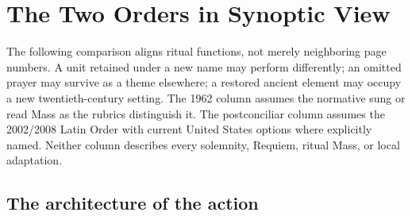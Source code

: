 \section{The Two Orders in Synoptic View}

The following comparison aligns ritual functions, not merely neighboring page numbers. A unit retained under a new name may perform differently; an omitted prayer may survive as a theme elsewhere; a restored ancient element may occupy a new twentieth-century setting. The 1962 column assumes the normative sung or read Mass as the rubrics distinguish it. The postconciliar column assumes the 2002/2008 Latin Order with current United States options where explicitly named. Neither column describes every solemnity, Requiem, ritual Mass, or local adaptation.

\subsection{The architecture of the action}

